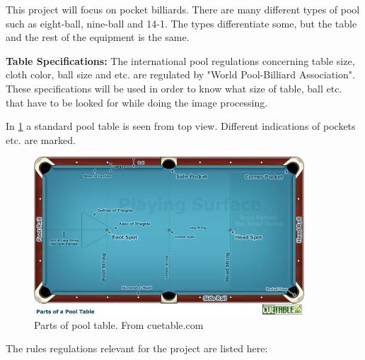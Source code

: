 This project will focus on pocket billiards. There are many different types of pool such as eight-ball, nine-ball and 14-1. The types differentiate some, but the table and the rest of the equipment is the same.

\textbf{Table Specifications:}
The international pool regulations concerning table size, cloth color, ball size and etc. are regulated by "World Pool-Billiard Association"\cite{poolregulations}. These specifications will be used in order to know what size of table, ball etc. that have to be looked for while doing the image processing.

In \ref{fig:partspool} a standard pool table is seen from top view. Different indications of pockets etc. are marked.

\begin{figure}[htpb]
\begin{center}
\leavevmode
\includegraphics[width=0.9\textwidth]{images/pooltablespecs.jpg}
\end{center}
\caption{Parts of pool table. From cuetable.com}
\label{fig:partspool}
\end{figure}

The rules regulations relevant for the project are listed here:

